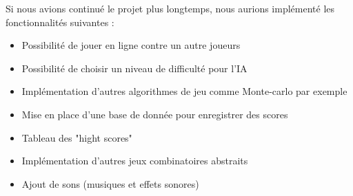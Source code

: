 Si nous avions continué le projet plus longtemps, nous aurions implémenté les fonctionnalités suivantes :

\begin{itemize}
    \item Possibilité de jouer en ligne contre un autre joueurs
    \item Possibilité de choisir un niveau de difficulté pour l'IA
    \item Implémentation d'autres algorithmes de jeu comme Monte-carlo par exemple
    \item Mise en place d'une base de donnée pour enregistrer des scores
    \item Tableau des "hight scores"
    \item Implémentation d'autres jeux combinatoires abstraits
    \item Ajout de sons (musiques et effets sonores)
\end{itemize}